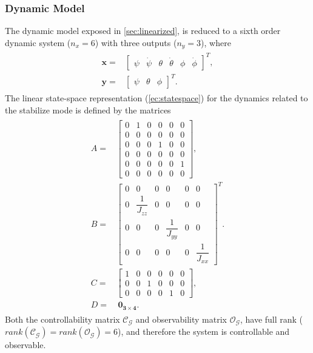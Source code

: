 \subsubsection{Dynamic Model}
The dynamic model exposed in \ref{sec:linearized}, is reduced to a sixth order dynamic system ($n_x = 6$) with  three outputs ($n_y = 3$), where
\begin{align}
\begin{split}
\mathbf{x} = & \begin{bmatrix}
\psi & \dot{\psi} & \theta & \dot{\theta} & \phi & \dot{\phi}
\end{bmatrix}^{T},\\[15px]
\mathbf{y} = & \begin{bmatrix}
\psi & \theta & \phi
\end{bmatrix}^{T}.
\end{split}
\end{align}
The linear state-space representation (\ref{ec:statespace}) for the dynamics related to the stabilize mode is defined by the matrices
\begin{align}
\begin{split}
A = & 
\begin{bmatrix}
0 & 1 & 0 & 0 & 0 & 0 \\[2px]
0 & 0 & 0 & 0 & 0 & 0 \\[2px]
0 & 0 & 0 & 1 & 0 & 0 \\[2px]
0 & 0 & 0 & 0 & 0 & 0 \\[2px]
0 & 0 & 0 & 0 & 0 & 1 \\[2px]
0 & 0 & 0 & 0 & 0 & 0
\end{bmatrix}, \\[10px]
B = & 
\begin{bmatrix}
0 & 0 & 0 & 0 & 0 & 0\\[5px]
0 & \dfrac{1}{J_{zz}} & 0 & 0 & 0 & 0\\[5px]
0 & 0 & 0 & \dfrac{1}{J_{yy}} & 0 & 0\\[5px]
0 & 0 & 0 & 0 & 0 & \dfrac{1}{J_{xx}}
\end{bmatrix}^{T}.\\[10px]
C = & 
\begin{bmatrix}
1 & 0 & 0 & 0 & 0 & 0 \\[2px]
0 & 0 & 1 & 0 & 0 & 0 \\[2px]
0 & 0 & 0 & 0 & 1 & 0
\end{bmatrix}, \\[10px]
D = &\ \mathbf{0_{3\times 4}}.
\end{split}
\end{align}
Both the controllability matrix $\mathcal{C_G}$ and observability matrix $\mathcal{O_G}$, have full rank ($rank(\mathcal{C_G}) = rank(\mathcal{O_G}) = 6$), and therefore the system is controllable and observable.

